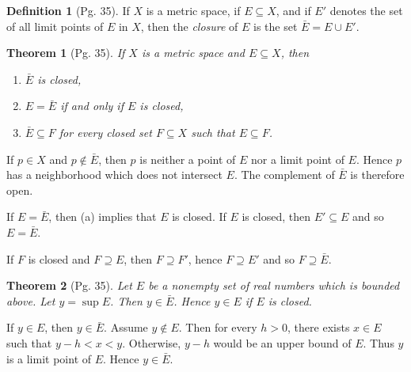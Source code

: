 \documentclass[leqno]{article}
\makeatletter
\newtheorem{theorem}{Theorem}[section]
\theoremstyle{definition}
\newtheorem{definition}{Definition}[section]
\theoremstyle{remark}
\let\oldproofname=\proofname
\renewcommand{\proofname}{\bf{\textit{\oldproofname}}}
\renewenvironment{proof}[1][\proofname]{\par
  \pushQED{\qed}%
  \normalfont \topsep6\p@\@plus6\p@\relax
  \list{}{\leftmargin=0mm
          \rightmargin=0mm
          \settowidth{\itemindent}{\itshape#1}%
          \labelwidth=4mm
          \parsep=0pt \listparindent=0mm%
  }
  \item[\hskip\labelsep
        \itshape
    #1\@addpunct{.}]\ignorespaces
}{%
  \popQED\endlist\@endpefalse
}
\makeatother
\begin{document}
            \begin{definition}[Pg. 35]\label{def:5.6}
                If $X$ is a metric space, if $E\subseteq X$, and if $E'$ denotes the set of all limit points of $E$ in $X$, then the \emph{closure} of $E$ is the set $\bar{E}=E\cup E'$. \cite{rud}
            \end{definition}
            \begin{theorem}[Pg. 35]\label{thm:5.6}
                If $X$ is a metric space and $E\subseteq X$, then 
                    \begin{enumerate}[label=\normalfont{(\alph*)}]
                        \item $\bar{E}$ is closed,
                        \item $E=\bar{E}$ if and only if $E$ is closed,
                        \item $\bar{E}\subseteq F$ for every closed set $F\subseteq X$ such that $E\subseteq F$.
                    \end{enumerate} 
            \end{theorem}
                \begin{proof}
                    If $p\in X$ and $p\notin\bar{E}$, then $p$ is neither a point of $E$ nor a limit point of $E$. Hence $p$ has a neighborhood which does not intersect $E$. The complement of $\bar{E}$ is therefore open.\par\hspace{4mm} If $E=\bar{E}$, then (a) implies that $E$ is closed. If $E$ is closed, then $E'\subseteq E$ and so $E=\bar{E}$.\par\hspace{4mm} If $F$ is closed and $F\supseteq E$, then $F\supseteq F'$, hence $F\supseteq E'$ and so $F\supseteq\bar{E}$.
                \end{proof}
            \begin{theorem}[Pg. 35]\label{thm:5.7}
                Let $E$ be a nonempty set of real numbers which is bounded above. Let $y=\sup E$. Then $y\in\bar{E}$. Hence $y\in E$ if $E$ is closed. 
            \end{theorem}
                \begin{proof}
                    If $y\in E$, then $y\in\bar{E}$. Assume $y\notin E$. Then for every $h>0$, there exists $x\in E$ such that $y-h<x<y$. Otherwise, $y-h$ would be an upper bound of $E$. Thus $y$ is a limit point of $E$. Hence $y\in\bar{E}$. 
                \end{proof}
\end{document}
